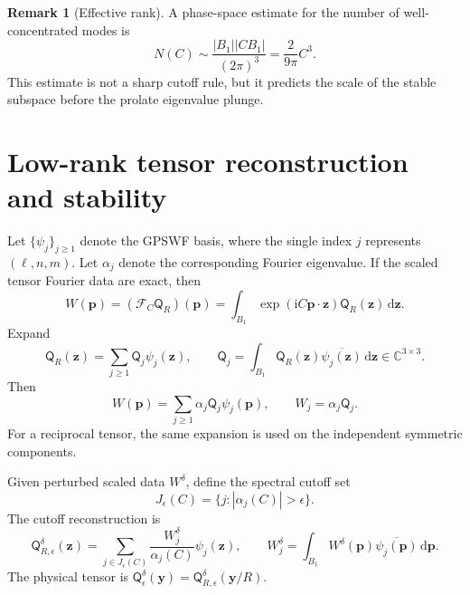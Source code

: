 \documentclass[11pt]{article}
\numberwithin{equation}{section}
\newcommand{\C}{\mathbb{C}}
\newcommand{\ii}{\mathrm{i}}
\newcommand{\dd}{\,\mathrm d}
\newcommand{\vect}[1]{\bm{#1}}
\newcommand{\tens}[1]{\bm{\mathsf{#1}}}
\newcommand{\F}{\mathcal{F}}
\newcommand{\Qt}{\ensuremath{\tens{Q}}}
\newcommand{\abs}[1]{\left\lvert #1\right\rvert}
\theoremstyle{plain}
\theoremstyle{definition}
\newtheorem{remark}[theorem]{Remark}
\begin{document}
\begin{remark}[Effective rank]
A phase-space estimate for the number of well-concentrated modes is
\begin{equation*}
  N(C)\sim\frac{\abs{B_1}\abs{CB_1}}{(2\pi)^3}
  =\frac{2}{9\pi}C^3.
\end{equation*}
This estimate is not a sharp cutoff rule, but it predicts the scale of the stable subspace before the prolate eigenvalue plunge.
\end{remark}

\section{Low-rank tensor reconstruction and stability}\label{sec:regularization}

Let $\{\psi_j\}_{j\ge1}$ denote the GPSWF basis, where the single index $j$ represents $(\ell,n,m)$.  Let $\alpha_j$ denote the corresponding Fourier eigenvalue.  If the scaled tensor Fourier data are exact, then
\begin{equation*}
  W(\vect{p})=(\F_C\Qt_R)(\vect{p})=\int_{B_1}\exp(\ii C\vect{p}\cdot \vect{z})\Qt_R(\vect{z})\dd \vect{z}.
\end{equation*}
Expand
\begin{equation*}
  \Qt_R(\vect{z})=\sum_{j\ge1}\tens{Q}_j\psi_j(\vect{z}),
  \qquad
  \tens{Q}_j=\int_{B_1}\Qt_R(\vect{z})\overline{\psi_j(\vect{z})}\dd \vect{z}\in\C^{3\times3}.
\end{equation*}
Then
\begin{equation*}
  W(\vect{p})=\sum_{j\ge1}\alpha_j\tens{Q}_j\psi_j(\vect{p}),
  \qquad
  W_j=\alpha_j\tens{Q}_j.
\end{equation*}
For a reciprocal tensor, the same expansion is used on the independent symmetric components.

Given perturbed scaled data $W^\delta$, define the spectral cutoff set
\begin{equation*}
  J_\epsilon(C)=\{j:\abs{\alpha_j(C)}>\epsilon\}.
\end{equation*}
The cutoff reconstruction is
\begin{equation}\label{eq:Q_cutoff}
  \Qt_{R,\epsilon}^\delta(\vect{z})=
  \sum_{j\in J_\epsilon(C)}\frac{W_j^\delta}{\alpha_j(C)}\psi_j(\vect{z}),
  \qquad
  W_j^\delta=\int_{B_1}W^\delta(\vect{p})\overline{\psi_j(\vect{p})}\dd \vect{p}.
\end{equation}
The physical tensor is $\Qt_\epsilon^\delta(\vect{y})=\Qt_{R,\epsilon}^\delta(\vect{y}/R)$.
\end{document}

